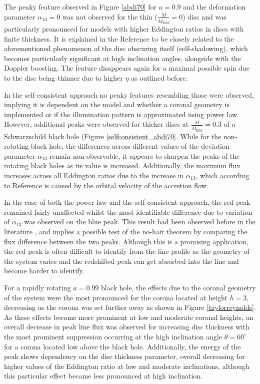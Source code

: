 \documentclass[fleqn,usenatbib,useAMS]{mnras}
\begin{document}
The peaky feature observed in Figure \ref{abdi70} for $a = 0.9$ and the deformation parameter $\alpha_{13} = 0$ was not observed for the thin ($\frac{\dot{M}}{\dot{M}_\text{Edd}} = 0$) disc and was particularly pronounced for models with higher Eddington ratios in discs with finite thickness. It is explained in the Reference \cite{abdikamalov2020testing} to be closely related to the aforementioned phenomenon of the disc obscuring itself (self-shadowing), which becomes particularly significant at high inclination angles, alongside with the Doppler boosting. The feature disappears again for a maximal possible spin due to the disc being thinner due to higher $\eta$ as outlined before. 

In the self-consistent approach no peaky features resembling those were observed, implying it is dependent on the model and whether a coronal geometry is implemented or if the illumination pattern is approximated using power law. However, additional peaks were observed for thicker discs at $\frac{\dot{M}}{\dot{M}_\text{Edd}} = 0.3$ of a Schwarzschild black hole (Figure \ref{selfconsistent_abdi70}. 
While for the non-rotating black hole, the differences across different values of the deviation parameter $\alpha_{13}$ remain non-observable, it appears to sharpen the peaks of the rotating black holes as its value is increased. Additionally, the maximum flux increases across all Eddington ratios due to the increase in $\alpha_{13}$, which according to Reference \cite{johannsen2014x} is caused by the orbital velocity of the accretion flow. 

In the case of both the power law and the self-consistent approach, the red peak remained fairly unaffected whilst the most identifiable difference due to variation of $\alpha_{13}$ was observed on the blue peak. This result had been observed before in the literature \cite{johannsen2014x}, \cite{johannsen2013testing} and implies a possible test of the no-hair theorem by comparing the flux difference between the two peaks. Although this is a promising application, the red peak is often difficult to identify from the line profile as the geometry of the system varies and the redshifted peak can get absorbed into the line and become harder to identify. 

For a rapidly rotating $a = 0.99$ black hole, the effects due to the coronal geometry of the system were the most pronounced for the corona located at height $h = 3$, decreasing as the corona was set further away as shown in Figure \ref{taylorreynolds}. As these effects become more prominent at low and moderate coronal heights, an overall decrease in peak line flux was observed for increasing disc thickness with the most prominent suppression occurring at the high inclination angle $\theta = 60^{\circ}$ for a corona located low above the black hole. Additionally, the energy of the peak shows dependency on the disc thickness parameter, overall decreasing for higher values of the Eddington ratio at low and moderate inclinations, although this particular effect became less pronounced at high inclination.
\end{document}
